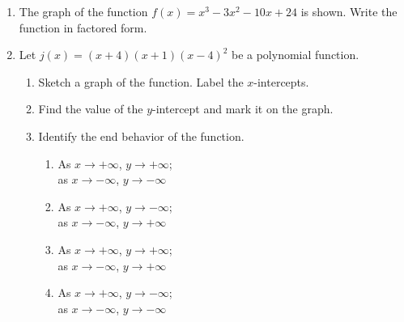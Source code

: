 \documentclass[12pt, twoside]{article}
\begin{document}
\begin{enumerate}[itemsep=0.5cm]
\newpage
\item The graph of the function $f(x) = x^3 - 3x^2 - 10x + 24$ is shown. Write the function in factored form. 
    \begin{flushright}
    \end{flushright}

\item Let $j(x)= (x+4)(x+1)(x-4)^2$ be a polynomial function. 
    \begin{center}
    \end{center}
    \begin{enumerate}[itemsep=0.25cm]
        \item Sketch a graph of the function. Label the $x$-intercepts.
        \item Find the value of the $y$-intercept and mark it on the graph. \vspace{1cm}
        \item Identify the end behavior of the function.
            \begin{multicols}{2}
            \begin{enumerate}
                \item As $x \to +\infty$, $y \to +\infty$; \\ 
                as $x \to -\infty$, $y \to -\infty$
                \item As $x \to +\infty$, $y \to -\infty$; \\
                as $x \to -\infty$, $y \to +\infty$
                \item As $x \to +\infty$, $y \to +\infty$; \\
                as $x \to -\infty$, $y \to +\infty$
                \item As $x \to +\infty$, $y \to -\infty$; \\
                as $x \to -\infty$, $y \to -\infty$        
            \end{enumerate}
            \end{multicols}
    \end{enumerate}


\end{enumerate}
\end{document}
